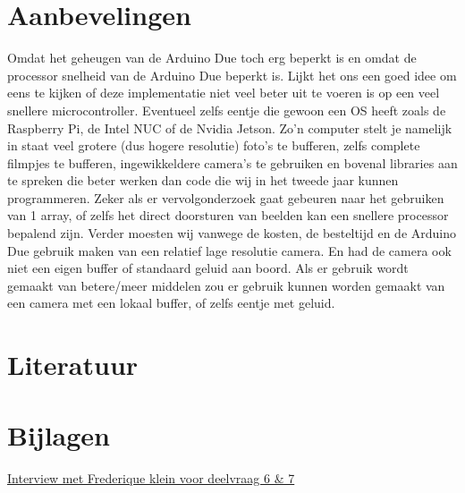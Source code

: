 \documentclass{article}
\begin{document}
\section{Aanbevelingen}
Omdat het geheugen van de Arduino Due toch erg beperkt is en omdat de processor snelheid van de Arduino Due beperkt is. Lijkt het ons een goed idee om eens te kijken of deze implementatie niet veel beter uit te voeren is op een veel snellere microcontroller. Eventueel zelfs eentje die gewoon een OS heeft zoals de Raspberry Pi, de Intel NUC of de Nvidia Jetson. Zo’n computer stelt je namelijk in staat veel grotere (dus hogere resolutie) foto’s te bufferen, zelfs complete filmpjes te bufferen, ingewikkeldere camera’s te gebruiken en bovenal libraries aan te spreken die beter werken dan code die wij in het tweede jaar kunnen programmeren. Zeker als er vervolgonderzoek gaat gebeuren naar het gebruiken van 1 array, of zelfs het direct doorsturen van beelden kan een snellere processor bepalend zijn.
Verder moesten wij vanwege de kosten, de besteltijd en de Arduino Due gebruik maken van een relatief lage resolutie camera. En had de camera ook niet een eigen buffer of standaard geluid aan boord. Als er gebruik wordt gemaakt van betere/meer middelen zou er gebruik kunnen worden gemaakt van een camera met een lokaal buffer, of zelfs eentje met geluid. 

\section{Literatuur}
\citet{bmp280adafruit}

\section{Bijlagen}

\href{https://docs.google.com/document/d/1SsX8LF4RwbH1YNNYjNoLCvhxlJQ-Cs8OT3DVWehyQDE/edit?usp=sharing}{Interview met Frederique klein voor deelvraag 6 \& 7}


\end{document}
